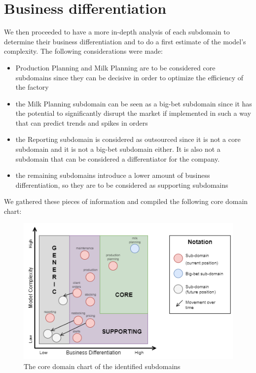 \section{Business differentiation}
We then proceeded to have a more in-depth analysis of each subdomain to determine their business differentiation and to do a first estimate of the model's complexity. The following considerations were made:
\begin{itemize}
    \item Production Planning and Milk Planning are to be considered core subdomains since they can be decisive in order to optimize the efficiency of the factory
    \item the Milk Planning subdomain can be seen as a big-bet subdomain since it has the potential to significantly disrupt the market if implemented in such a way that can predict trends and spikes in orders
    \item the Reporting subdomain is considered as outsourced since it is not a core subdomain and it is not a big-bet subdomain either. It is also not a subdomain that can be considered a differentiator for the company.
    \item the remaining subdomains introduce a lower amount of business differentiation, so they are to be considered as supporting subdomains
\end{itemize}

We gathered these pieces of information and compiled the following core domain chart:

\begin{figure}[H]
    \centering
    \includegraphics[width=\textwidth]{img/core-domain-chart.png}
    \caption{The core domain chart of the identified subdomains}
    \label{img:core-domain-chart}
\end{figure}
